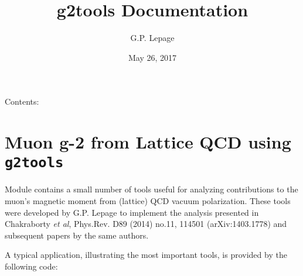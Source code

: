 \documentclass[letterpaper,10pt,english]{sphinxmanual}
\title{g2tools Documentation}
\date{May 26, 2017}
\author{G.P. Lepage}
\begin{document}
\maketitle
\tableofcontents
{}\label{index::doc}


Contents:


\chapter{Muon g-2 from Lattice QCD using \texttt{g2tools}}
\label{overview:g2tools-documentation}\label{overview:muon-g-2-from-lattice-qcd-using-g2tools}\label{overview::doc}
Module {\hyperref[g2tools:module-g2tools]{\emph{}}} contains a small number of tools useful for analyzing
contributions to the muon's magnetic moment from (lattice) QCD vacuum
polarization. These tools were developed by G.P. Lepage to implement the
analysis presented in Chakraborty \emph{et al}, Phys.Rev. D89 (2014) no.11, 114501
(arXiv:1403.1778) and subsequent papers by the same authors.

A typical application, illustrating the most important tools, is
provided by the following code:
\end{document}
